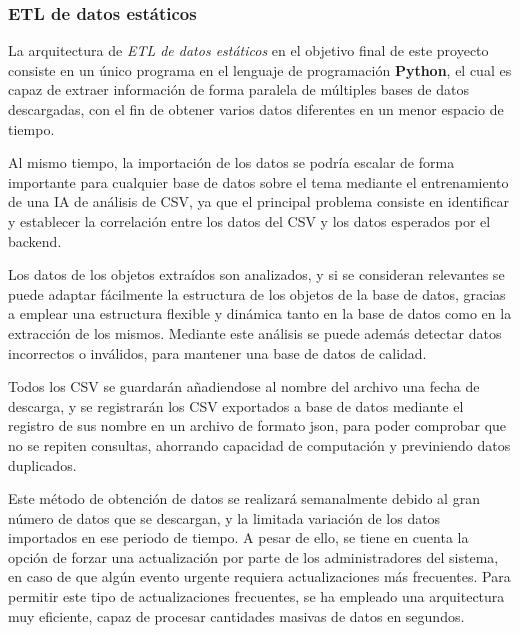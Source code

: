 \subsubsection{ETL de datos estáticos}

La arquitectura de \textit{ETL de datos estáticos} en el objetivo final de este proyecto consiste en un único programa 
en el lenguaje de programación \textbf{Python}, el cual es capaz de extraer información de forma paralela de múltiples bases de datos descargadas, 
con el fin de obtener varios datos diferentes en un menor espacio de tiempo.

Al mismo tiempo, la importación de los datos se podría escalar de forma importante para cualquier base de datos sobre el tema mediante el entrenamiento de una IA de análisis de CSV, 
ya que el principal problema consiste en identificar y establecer la correlación entre los datos del CSV y los datos esperados por el backend.

Los datos de los objetos extraídos son analizados, y si se consideran relevantes se puede adaptar fácilmente la estructura de los objetos de la base de datos, 
gracias a emplear una estructura flexible y dinámica tanto en la base de datos como en la extracción de los mismos. 
Mediante este análisis se puede además detectar datos incorrectos o inválidos, para mantener una base de datos de calidad.

Todos los CSV se guardarán añadiendose al nombre del archivo una fecha de descarga, y se registrarán los CSV exportados a base de datos mediante el registro de sus nombre en un archivo de formato json, 
para poder comprobar que no se repiten consultas, ahorrando capacidad de computación y previniendo datos duplicados.

Este método de obtención de datos se realizará semanalmente debido al gran número de datos que se descargan, y la limitada variación de los datos importados en ese periodo de tiempo. 
A pesar de ello, se tiene en cuenta la opción de forzar una actualización por parte de los administradores del sistema, en caso de que algún evento urgente requiera actualizaciones más frecuentes.
Para permitir este tipo de actualizaciones frecuentes, se ha empleado una arquitectura muy eficiente, capaz de procesar cantidades masivas de datos en segundos.
